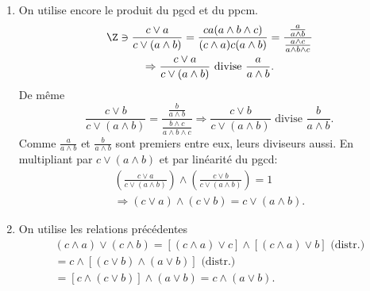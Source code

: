 \begin{enumerate}
 \item On utilise encore le produit du pgcd et du ppcm.
\begin{multline*}
 \Z \ni \frac{c \vee a}{c \vee(a \wedge b)}
 = \frac{ca(a \wedge b \wedge c)}{(c \wedge a) c(a\wedge b)}
 = \frac{\frac{a}{a\wedge b}}{\frac{a \wedge c}{a\wedge b \wedge c}}\\
 \Rightarrow 
 \frac{c \vee a}{c \vee(a \wedge b)} \text{ divise }\frac{a}{a\wedge b}.
\end{multline*}
De même
\[
 \frac{c \vee b}{c \vee(a \wedge b)}
 = \frac{\frac{b}{a\wedge b}}{\frac{b \wedge c}{a\wedge b \wedge c}}
 \Rightarrow 
 \frac{c \vee b}{c \vee(a \wedge b)} \text{ divise }\frac{b}{a\wedge b}.
\]
Comme $\frac{a}{a\wedge b}$ et $\frac{b}{a\wedge b}$ sont premiers entre eux, leurs diviseurs aussi.\newline
En multipliant par $c\vee(a\wedge b)$ et par linéarité du pgcd:
\begin{multline*}
 \left( \frac{c \vee a}{c\vee(a \wedge b)}\right) \wedge \left( \frac{c \vee b}{c\vee(a \wedge b)}\right) = 1 \\
 \Rightarrow (c\vee a)\wedge (c \vee b)= c\vee(a\wedge b).
\end{multline*}

 \item On utilise les relations précédentes
\begin{multline*}
 (c\wedge a)\vee (c \wedge b) 
 = \left[ (c \wedge a)\vee c\right] \wedge \left[ (c \wedge a)\vee b\right] \text{ (distr.)} \\
 = c \wedge \left[ (c \vee b) \wedge (a \vee b) \right] \text{ (distr.)} \\
 = \left[ c \wedge (c \vee b) \right] \wedge (a \vee b) 
 = c \wedge (a \vee b).
\end{multline*}

\end{enumerate}
